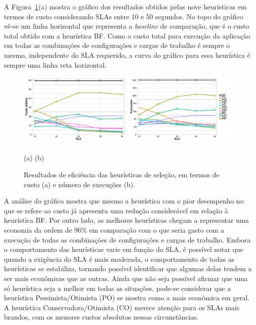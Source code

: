 \documentclass[12pt]{article}
\begin{document}
A Figura~\ref{fig:cost-time}(a) mostra o gráfico dos resultados obtidos pelas
nove heurísticas em termos de custo considerando SLAs 
entre 10 e 50 segundos. No topo do gráfico vê-se um linha horizontal
que representa a \emph{baseline} de comparação, que é o custo total obtido com a heurística BF. Como o custo total para execução da aplicação em todas
as combinações de configurações e cargas de trabalho é sempre o mesmo, independente
do SLA requerido, a curva do gráfico para essa heurística é sempre uma linha reta horizontal.

\begin{figure}[t]
\centering\footnotesize
  \includegraphics[trim = 12mm 10mm 8mm 20mm, width=0.49\textwidth]{img/graphic-cost-capacity.png}
  \includegraphics[trim = 12mm 10mm 8mm 20mm, width=0.49\textwidth]{img/graphic-time-capacity.png}
  \\~\\\hspace{0.24\textwidth}(a) \hfill (b) \hspace{0.24\textwidth}
  \caption{\label{fig:cost-time}Resultados de eficiência das heurísticas de seleção, em termos de custo (a) e número de execuções (b).}
\end{figure}

A análise do gráfico mostra que mesmo a heurística com o pior 
desempenho no que se refere ao custo já apresenta uma redução considerável 
em relação à heurística BF. Por outro lado, as melhores heurísticas chegam a 
representar uma economia da ordem de 96\% em comparação com o que seria gasto
com a execução de todas as combinações de configurações e cargas de trabalho.
Embora o comportamento das heurísticas varie em função do SLA, é possível notar
que quando a exigência do SLA é mais moderada, o comportamento de todas as heurísticas
se estabiliza, tornando possível identificar que algumas delas tendem a
ser mais econômicas que as outras. Ainda que não seja possível afirmar que uma só 
heurística seja a melhor em todas as situações, pode-se considerar que a heurística
Pessimista/Otimista (PO) se mostra como a mais econômica em geral. A heurística
Conservadora/Otimista (CO) merece atenção para os SLAs mais brandos, com os menores
custos absolutos nessas circunstâncias. 
\end{document}
